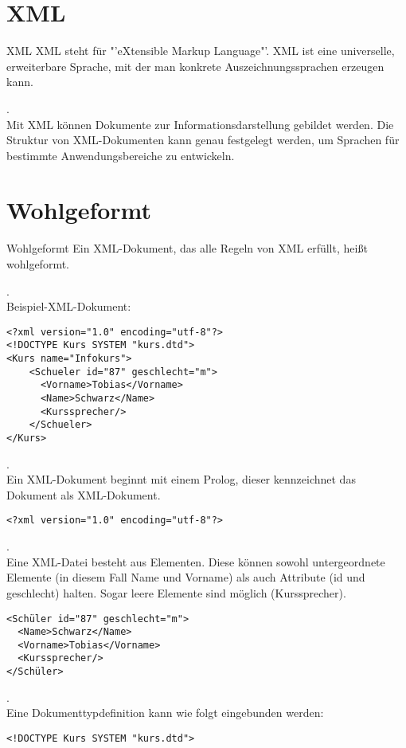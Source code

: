 \section{XML}
\begin{zitat}{XML}
XML steht für  "'eXtensible Markup Language"'. XML ist eine universelle, erweiterbare Sprache, mit der man konkrete Auszeichnungssprachen erzeugen kann.
\end{zitat}
.\\
Mit XML können Dokumente zur Informationsdarstellung gebildet werden.
Die Struktur von XML-Dokumenten kann genau festgelegt werden, um Sprachen für bestimmte Anwendungsbereiche zu entwickeln.
\section{Wohlgeformt}
\begin{zitat}{Wohlgeformt}
 Ein XML-Dokument, das alle Regeln von XML erfüllt, heißt wohlgeformt.
\end{zitat}
.\\
Beispiel-XML-Dokument:
\lstset{language=XML}
\begin{lstlisting}
<?xml version="1.0" encoding="utf-8"?>
<!DOCTYPE Kurs SYSTEM "kurs.dtd">
<Kurs name="Infokurs">
    <Schueler id="87" geschlecht="m">
      <Vorname>Tobias</Vorname>
      <Name>Schwarz</Name>
      <Kurssprecher/>
    </Schueler>
</Kurs>
\end{lstlisting}
.\\
Ein XML-Dokument beginnt mit einem Prolog, dieser kennzeichnet das Dokument als XML-Dokument.
\begin{lstlisting}
<?xml version="1.0" encoding="utf-8"?>
\end{lstlisting}
.\\
Eine XML-Datei besteht aus Elementen. Diese können sowohl untergeordnete Elemente (in diesem Fall Name und Vorname) als auch Attribute (id und geschlecht) halten. Sogar leere Elemente sind möglich (Kurssprecher).
\begin{lstlisting}
<Schüler id="87" geschlecht="m">
  <Name>Schwarz</Name>
  <Vorname>Tobias</Vorname>
  <Kurssprecher/>
</Schüler>
\end{lstlisting}
.\\
Eine Dokumenttypdefinition kann wie folgt eingebunden werden:
\begin{lstlisting}
<!DOCTYPE Kurs SYSTEM "kurs.dtd">
\end{lstlisting}
\newpage
